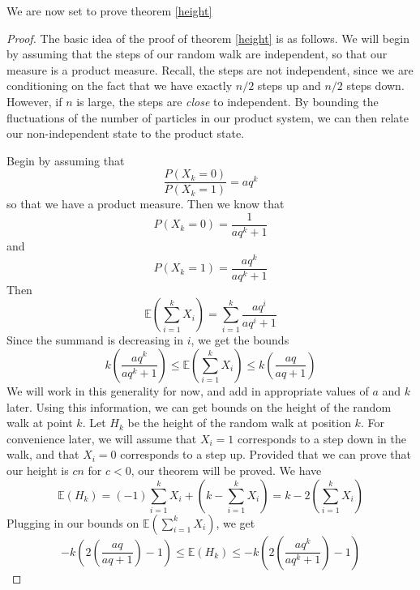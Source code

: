 \documentclass[12pt]{report}
\theoremstyle{definition}
\begin{document}
We are now set to prove theorem \ref{height}
\begin{proof}
The basic idea of the proof of theorem \ref{height} is as follows.  We will begin by assuming that the steps of our random walk are independent, so that our measure is a product measure.  Recall, the steps are not independent, since we are conditioning on the fact that we have exactly $n/2$ steps up and $n/2$ steps down.  However, if $n$ is large, the steps are {\em close} to independent.  By bounding the fluctuations of the number of particles in our product system, we can then relate our non-independent state to the product state. 

Begin by assuming that 
$$
\frac{P(X_k=0)}{P(X_k=1)}=aq^k
$$
so that we have a product measure. 
Then we know that 
$$
P(X_k=0)=\frac{1}{aq^k+1}
$$ and $$P(X_k=1)=\frac{aq^k}{aq^k+1}$$
Then 
$$
\mathbb{E}\left(\sum_{i=1}^k X_i\right)=\sum_{i=1}^k\frac{aq^i}{aq^i+1}$$
Since the summand is decreasing in 
$i$, we get the bounds 
$$
k\left(\frac{aq^k}{aq^k+1}\right)\leq \mathbb{E}\left(\sum_{i=1}^k  X_i\right)\leq k\left(\frac{aq}{aq+1}\right)
$$
We will work in this generality for now, and add in appropriate values of $a$ and $k$ later.  Using this information, we can get bounds on the height of the random walk at point $k$.  Let $H_k$ be the height of the random walk at position $k$. For convenience later, we will assume that $X_i=1$ corresponds to a step down in the walk, and that $X_i=0$ corresponds to a step up.  Provided that we can prove that our height is $cn$ for $c<0$, our theorem will be proved.  We have  
$$
\mathbb{E}(H_k)=(-1)\sum_{i=1}^k X_i+\left(k-\sum_{i=1}^k X_i\right)=k-2\left(\sum_{i=1}^k X_i\right)
$$
Plugging in our bounds on $\mathbb{E}\left(\sum_{i=1}^k X_i\right)$, we get 
$$
-k\left(2\left(\frac{aq}{aq+1}\right)-1\right)\leq\mathbb{E}(H_k)\leq -k\left(2\left(\frac{aq^k}{aq^k+1}
\right)-1\right)
$$


\end{proof}
\end{document}
